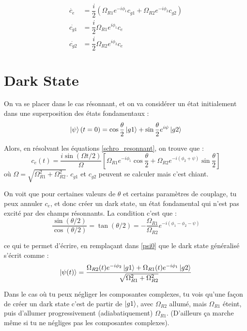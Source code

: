 \documentclass[a4paper]{report}
\begin{document}
  \begin{align}
  \label{schro_resonnant}
  \dot{c_e}&=\dfrac{i}{2}(\Omega_{R1}e^{-i\phi_1}c_{g1}+\Omega_{R2}e^{-i\phi_2}c_{g2})\\
  \dot{c_{g1}}&=\dfrac{i}{2}\Omega_{R1}e^{i\phi_1}c_e \\
  \dot{c_{g2}}&=\dfrac{i}{2}\Omega_{R2}e^{i\phi_2}c_e 
  \end{align}
  
\section{Dark State}
On va se placer dans le cas résonnant, et on va considérer un état initialement dans une superposition des états fondamentaux : 
\begin{equation}
\label{psi0}
\ket{\psi}(t=0)=\cos\dfrac{\theta}{2} \ket{g1} + \sin\dfrac{\theta}{2} e^{i \psi}\ket{g2}
\end{equation}

Alors, en résolvant les équations \ref{schro_resonnant}, on trouve que :
\begin{equation}
c_e(t)=\dfrac{i \sin (\Omega t /2)}{\Omega}\left[\Omega_{R1}e^{-i\phi_1} \cos\dfrac{\theta}{2} + \Omega_{R2}e^{-i(\phi_2+\psi)} \sin\dfrac{\theta}{2} \right]
\end{equation}
où $\Omega = \sqrt{\Omega_{R1}^2+\Omega_{R2}^2}$. $c_{g1}$ et $c_{g2}$ peuvent se calculer mais c'est chiant.

On voit que pour certaines valeurs de $\theta$ et certains paramètres de couplage, tu peux annuler $c_e$, et donc créer un dark state, un état fondamental qui n'est pas excité par des champs résonnants. La condition c'est que :
\begin{equation}
\dfrac{\sin (\theta/2)}{\cos (\theta/2)} = \tan (\theta/2) = - \dfrac{\Omega_{R1}}{\Omega_{R2}} e^{-i(\phi_1-\phi_2-\psi)}
\end{equation}

ce qui te permet d'écrire, en remplaçant dans \ref{psi0} que le dark state généralisé s'écrit comme : 
\begin{equation}
\ket{\psi(t)}=\dfrac{\Omega_{R2}(t)e^{-i\phi_2}\ket{g1}+\Omega_{R1}(t)e^{-i\phi_1}\ket{g2}}{\sqrt{\Omega_{R1}^2+\Omega_{R2}^2}}
\end{equation}

Dans le cas où tu peux négliger les composantes complexes, tu vois qu'une façon de créer un dark state c'est de partir de $\ket{g1}$, avec $\Omega_{R2}$ allumé, mais $\Omega_{R1}$ éteint, puis d'allumer progressivement (adiabatiquement) $\Omega_{R1}$. (D'ailleurs ça marche même si tu ne négliges pas les composantes complexes).
\end{document}
